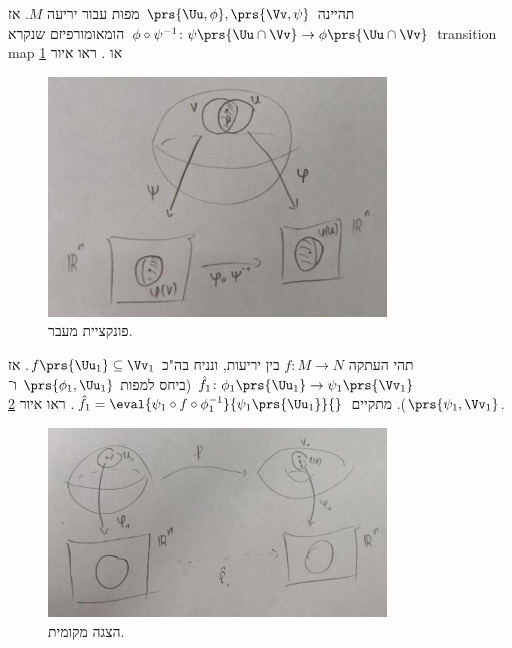 \documentclass[a4paper,10pt,twoside,openany]{book}
\begin{document}
\begin{definition}
תהיינה
$\prs{\Uu, \phi}, \prs{\Vv, \psi}$
מפות עבור יריעה
$M$.
אז
$\phi \circ \psi^{-1} \colon \psi\prs{\Uu \cap \Vv} \to \phi\prs{\Uu \cap \Vv}$
הומאומורפיזם שנקרא
 \textenglish{transition map}
או
.
ראו איור
\ref{fig3}
\begin{figure}[ht]
\centering
\caption{פונקציית מעבר.}
\label{fig3}
\includegraphics[width=0.8\textwidth]{sources/figure3}
\end{figure}
\end{definition}
\begin{definition}
תהי העתקה
$f \colon M \to N$
בין יריעות, ונניח בה"כ
$f\prs{\Uu_1} \subseteq \Vv_1$.
אז
$\hat{f}_1 \colon \phi_1\prs{\Uu_1} \to \psi_1\prs{\Vv_1}$
(ביחס למפות
$\prs{\phi_1, \Uu_1}$
ו־%
$\prs{\psi_1, \Vv_1}$).
מתקיים
$\hat{f}_1 = \eval{\psi_1 \circ f \circ \phi_1^{-1}}{\psi_1\prs{\Uu_1}}{}$.
ראו איור
\ref{fig4}.
\begin{figure}[ht]
\centering
\caption{הצגה מקומית.}
\label{fig4}
\includegraphics[width=0.8\textwidth]{sources/figure4}
\end{figure}
\end{definition}
\end{document}
